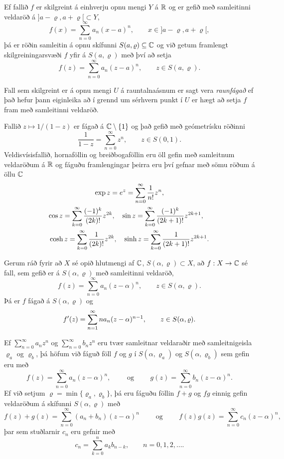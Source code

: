 Ef fallið $f$ er skilgreint á einhverju opnu mengi $Y$ á ${\mathbb R}$ og er
gefið með samleitinni veldaröð á $]a-{\varrho},a+{\varrho}[\subset Y$,
$$
f(x)=\sum\limits_{n=0}^{\infty} a_n(x-a)^n, \qquad 
x\in  ]a-{\varrho},a+{\varrho}[,
$$
þá er röðin samleitin á opnu skífunni $S(a,{\varrho})\subseteq {\mathbb C}$ og við getum 
framlengt skilgreiningarsvæði $f$ yfir á $S(a,{\varrho})$ með því að setja
$$
f(z)=\sum\limits_{n=0}^{\infty} a_n(z-a)^n, \qquad 
z\in  S(a,{\varrho}).
$$

\begin{sk}  Fall sem skilgreint er á opnu mengi $U$ á rauntalnaásnum
er sagt vera {\it raunfágað } ef það  hefur þann eiginleika að  
í grennd um sérhvern punkt í $U$ er hægt að setja $f$ fram með
samleitinni  veldaröð.
\end{sk}

Fallið $z\mapsto 1/(1-z)$ er fágað á ${\mathbb C}\setminus\{1\}$ og það 
gefið með geómetrísku röðinni
$$
\dfrac 1{1-z}=\sum_{n=0}^\infty z^n, \qquad z\in S(0,1). 
$$
Veldisvísisfallið, hornaföllin og breiðbogaföllin eru öll gefin með
samleitnum veldaröðum á ${\mathbb R}$ og fáguðu framlengingar þeirra eru því 
gefnar með sömu röðum á öllu ${\mathbb C}$
\begin{gather*}
\exp z =e\sp z = \sum_{n=0}^\infty \dfrac 1{n!}z^n, \\
\cos z = \sum_{k=0}\sp \infty \dfrac {(-1)\sp k}{(2k)!}z\sp{2k}, \quad
\sin z = \sum_{k=0}\sp \infty \dfrac {(-1)\sp k}{(2k+1)!}z\sp{2k+1},
\quad\\
\cosh z = \sum_{k=0}\sp \infty \dfrac {1}{(2k)!}z\sp{2k}, \quad
\sinh z = \sum_{k=0}\sp \infty \dfrac {1}{(2k+1)!}z\sp{2k+1}.
\end{gather*}


\begin{se}\label{set4.3.1} Gerum ráð fyrir að $X$ sé opið hlutmengi af ${\mathbb C}$, 
$S(\alpha,\varrho)\subset X$, að $f:X\to {\mathbb C}$
sé fall, sem  gefið er á $S(\alpha,\varrho)$ með samleitinni veldaröð,
 $$f(z)=\sum_{n=0}^\infty a_n(z-\alpha)^n, \qquad z\in S(\alpha,\varrho).
 $$
Þá er $f$ fágað á $S(\alpha,\varrho)$ og
 $$f{\sp{\prime}}(z)=\sum_{n=1}^\infty na_n(z-\alpha)^{n-1}, \qquad z\in
S(\alpha,\varrho). 
 $$
\end{se}

Ef $\sum_{n=0}^\infty a_nz^n$ og
$\sum_{n=0}^\infty b_nz^n$ eru tvær samleitnar veldaraðir með
samleitnigeisla $\varrho_a$ og $\varrho_b$, þá höfum við fáguð föll
$f$ og $g$ í $S(\alpha,\varrho_a)$ og $S(\alpha,\varrho_b)$ sem gefin
eru með 
$$
f(z)=\sum_{n=0}^\infty a_n(z-\alpha)^n, \qquad \text{ og } \qquad
g(z)=\sum_{n=0}^\infty b_n(z-\alpha)^n.
$$
Ef við setjum $\varrho=\min\{\varrho_a,\varrho_b\}$, þá eru fáguðu
föllin $f+g$ og $fg$ einnig gefin veldaröðum á skífunni
$S(\alpha,\varrho)$ með
$$
f(z)+g(z)=\sum_{n=0}^\infty (a_n+b_n)(z-\alpha)^n 
\qquad \text{ og } \qquad f(z)g(z)=\sum_{n=0}^\infty c_n(z-\alpha)^n,
$$
þar sem stuðlarnir $c_n$ eru gefnir með
$$
c_n=\sum_{k=0}^n a_kb_{n-k}, \qquad n=0,1,2,\dots. 
$$


